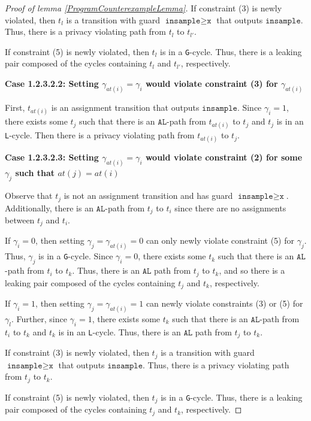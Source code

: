 \documentclass[12pt]{article}
\newcommand{\gguard}[1][x]{\texttt{insample}\geq #1}
\newcommand{\gcycle}{\texttt{G}-cycle}
\newcommand{\lcycle}{\texttt{L}-cycle}
\theoremstyle{definition}
\begin{document}
\begin{proof}[Proof of lemma \ref{ProgramCounterexampleLemma}]
    If constraint (3) is newly violated, then $t_l$ is a transition with guard $\gguard[\texttt{x}]$ that outputs $\texttt{insample}$. Thus, there is a privacy violating path from $t_l$ to $t_{l'}$. 

    If constraint (5) is newly violated, then $t_l$ is in a \gcycle. Thus, there is a leaking pair composed of the cycles containing $t_l$ and $t_{l'}$, respectively.

    \textbf{Case 1.2.3.2.2: Setting $\gamma_{at(i)}=\gamma_i$ would violate constraint (3) for $\gamma_{at(i)}$}

    First, $t_{at(i)}$ is an assignment transition that outputs $\texttt{insample}$. Since $\gamma_i = 1$, there exists some $t_j$ such that there is an $\texttt{AL}$-path from $t_{at(i)}$ to $t_j$ and $t_j$ is in an \lcycle. Then there is a privacy violating path from $t_{at(i)}$ to $t_j$.

    \textbf{Case 1.2.3.2.3: Setting $\gamma_{at(i)}=\gamma_i$ would violate constraint (2) for some $\gamma_j$ such that $at(j) = at(i)$}

    Observe that $t_j$ is not an assignment transition and has guard $\gguard[\texttt{x}]$. Additionally, there is an $\texttt{AL}$-path from $t_j$ to $t_i$ since there are no assignments between $t_j$ and $t_i$. 

    If $\gamma_i =0$, then setting $\gamma_j = \gamma_{at(i)} = 0$ can only newly violate constraint (5) for $\gamma_j$. Thus, $\gamma_j$ is in a \gcycle. Since $\gamma_i = 0$, there exists some $t_{k}$ such that there is an $\texttt{AL}$-path from $t_i$ to $t_{k}$. Thus, there is an $\texttt{AL}$ path from $t_j$ to $t_{k}$, and so there is a leaking pair composed of the cycles containing $t_j$ and $t_{k}$, respectively. 

    If $\gamma_i = 1$, then setting $\gamma_j = \gamma_{at(i)}=1$ can newly violate constraints (3) or (5) for $\gamma_l$. Further, since $\gamma_i =1$, there exists some $t_{k}$ such that there is an $\texttt{AL}$-path from $t_i$ to $t_{k}$ and $t_{k}$ is in an \lcycle. Thus, there is an $\texttt{AL}$ path from $t_j$ to $t_{k}$.
    
    If constraint (3) is newly violated, then $t_j$ is a transition with guard $\gguard[\texttt{x}]$ that outputs $\texttt{insample}$. Thus, there is a privacy violating path from $t_j$ to $t_{k}$. 

    If constraint (5) is newly violated, then $t_j$ is in a \gcycle. Thus, there is a leaking pair composed of the cycles containing $t_j$ and $t_{k}$, respectively.


\end{proof}
\end{document}
